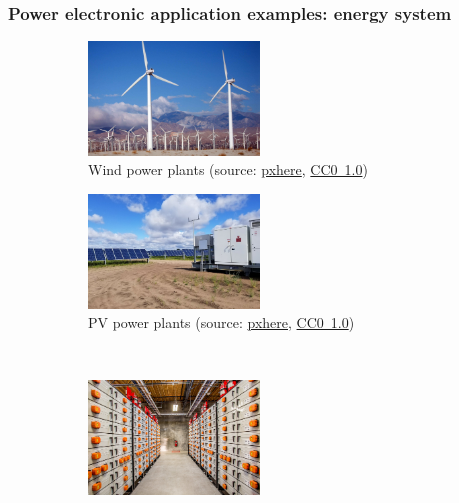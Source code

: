 \begin{frame}[c]
	\frametitle{Power electronic application examples: energy system}
	\begin{figure}
		\centering
		\begin{subfigure}[b]{0.49\textwidth}
			\centering
			\includegraphics[width=0.5\textwidth]{fig/lec01/sky-farm-windmill.jpg}
			\caption{Wind power plants (source: \href{https://pxhere.com/en/photo/954757}{pxhere}, \href{https://creativecommons.org/publicdomain/zero/1.0/}{CC0~1.0})}
		\end{subfigure}
		\pause
		\hfill
		\begin{subfigure}[b]{0.49\textwidth}
			\centering
			\includegraphics[width=0.5\textwidth]{fig/lec01/PV_field.jpg}
			\caption{PV power plants (source: \href{https://pxhere.com/en/photo/1685464}{pxhere}, \href{https://creativecommons.org/publicdomain/zero/1.0/}{CC0~1.0})}
		\end{subfigure}
		\pause
		\\
		\begin{subfigure}[b]{0.49\textwidth}
			\centering
			\includegraphics[width=0.5\textwidth]{fig/lec01/Battery_storage.jpg}

\end{subfigure}
\end{figure}
\end{frame}
